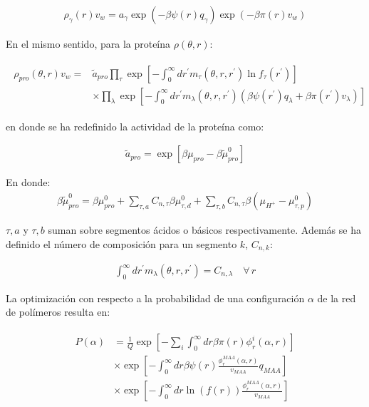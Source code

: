 \begin{align}
	\rho_\gamma(r)v_w = a_\gamma \exp{\left(-\beta \psi(r)q_\gamma\right)} \exp{\left(-\beta\pi(r) v_w\right)}
\end{align}


En el mismo sentido, para la prote\'ina $\rho(\theta,r)$:
	
	

\begin{align}
	\begin{aligned}
		\rho_{pro}(\theta, r)v_w = & \tilde{a}_{pro} \prod_\tau \exp\left[ -\int_0^\infty dr^\prime  m_\tau(\theta,r,r^\prime) \ln f_\tau(r^\prime)\right] \\
		& \times \prod_\lambda \exp\left[ -\int_0^\infty dr^\prime  m_\lambda(\theta,r,r^\prime)\left( \beta\psi(r^\prime) q_\lambda + \beta \pi(r^\prime) v_\lambda \right)\right]
	\end{aligned}
	\label{eq:esf:rho-pro}
\end{align}
	
	\noindent en donde se ha redefinido la actividad de la prote\'ina como:
	
	\begin{align}
		\tilde{a}_{pro} = \exp[\beta\mu_{pro} - \beta\tilde{\mu}^0_{pro}]
	\end{align}
	
		
En donde:
\begin{align}
	\beta\tilde{\mu}^0_{pro} =  \beta \mu^0_{pro}  + \sum_{\tau,a} C_{n,\tau}\beta\mu^0_{\tau,d} 
	+ \sum_{\tau,b} C_{n,\tau}\beta(\mu_{H^+} - \mu^0_{\tau,p})
\end{align}


\noindent $\tau,a$ y  $\tau,b$ suman sobre segmentos \'acidos o b\'asicos respectivamente. Adem\'as se ha definido el n\'umero de composici\'on para un segmento $k$, $C_{n,k}$:

	\begin{align}
		\int_0^\infty dr^\prime  m_\lambda(\theta,r,r^\prime) = C_{n,\lambda}\quad \forall \, r
		\label{eq:esf:composition}
	\end{align}

La optimizaci\'on con respecto a la probabilidad de una configuraci\'on $\alpha$ de la red de pol\'imeros resulta en:


\begin{align}
	\begin{aligned}
		P(\alpha)&=\frac{1}{Q}\exp\left[- \sum_i{\int_0^\infty{dr\beta\pi(r)\phi^i_r(\alpha,r)}}\right] \\
		& \times \exp \left[ -\int_0^\infty dr \beta \psi(r)\frac{\phi^{MAA}_r(\alpha,r)}{v_{MAA}} q_{MAA}  \right] \\
		& \times \exp\left[ -\int_0^\infty{ dr\ln(f(r))\frac{\phi^{MAA}_r(\alpha,r)}{v_{MAA}}}\right] \\
	\end{aligned}
	\label{eq:esf:proba-alfa}
\end{align}

